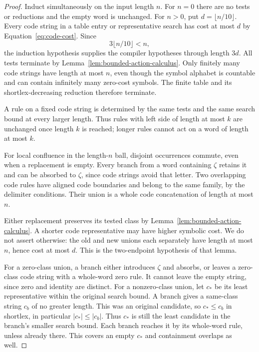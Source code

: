\begin{proof}
Induct simultaneously on the input length $n$.
For $n=0$ there are no tests or reductions and
the empty word is unchanged.  For $n>0$, put
$d=\lfloor n/10\rfloor$.  Every code string in
a table entry or representative search has cost
at most $d$ by Equation~\eqref{eq:code-cost}.
Since
\begin{equation}\label{eq:strict-encoding-dependency}
 3\lfloor n/10\rfloor<n,
\end{equation}
the induction hypothesis supplies the compiler
hypotheses through length $3d$.  All tests
terminate by Lemma~\ref{lem:bounded-action-calculus}.
Only finitely many code strings have length at
most $n$, even though the symbol alphabet is
countable and can contain infinitely many
zero-cost symbols.  The finite table and its
shortlex-decreasing reduction therefore terminate.

A rule on a fixed code string is determined by
the same tests and the same search bound at
every larger length.  Thus rules with left
side of length at most $k$ are unchanged once
length $k$ is reached; longer rules cannot
act on a word of length at most $k$.

For local confluence in the length-$n$ ball,
disjoint occurrences commute, even when a
replacement is empty.  Every branch from a
word containing $\zeta$ retains it and can
be absorbed to $\zeta$, since code strings
avoid that letter.  Two overlapping code
rules have aligned code boundaries and
belong to the same family, by the delimiter
conditions.  Their union is a whole code
concatenation of length at most $n$.

Either replacement preserves its tested class
by Lemma~\ref{lem:bounded-action-calculus}.
A shorter code representative may have higher
symbolic cost.  We do not assert otherwise:
the old and new unions each separately have
length at most $n$, hence cost at most $d$.
This is the two-endpoint hypothesis of that lemma.

For a zero-class union, a branch either
introduces $\zeta$ and absorbs, or leaves
a zero-class code string with a whole-word
zero rule.  It cannot leave the empty
string, since zero and identity are distinct.
For a nonzero-class union, let $c_*$ be
its least representative within the original
search bound.  A branch gives a same-class
string $c_b$ of no greater length.  This was
an original candidate, so $c_*\leq c_b$
in shortlex, in particular $|c_*|\leq|c_b|$.
Thus $c_*$ is still the least candidate in
the branch's smaller search bound.  Each
branch reaches it by its whole-word rule,
unless already there.  This covers an empty
$c_*$ and containment overlaps as well.


\end{proof}
